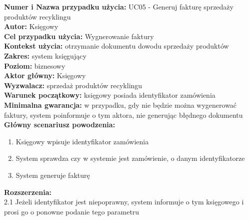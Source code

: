 \textbf{Numer i Nazwa przypadku użycia:} UC05 - Generuj fakturę sprzedaży produktów recyklingu \\
\textbf{Autor:} Księgowy\\
\textbf{Cel przypadku użycia:} Wygnerowanie faktury \\
\textbf{Kontekst użycia:} otrzymanie dokumentu dowodu sprzedaży produktów  \\
\textbf{Zakres:} system księgujący \\
\textbf{Poziom:} biznesowy \\
\textbf{Aktor główny:} Księgowy \\
\textbf{Wyzwalacz:} sprzedaż produktów recyklingu \\
\textbf{Warunek początkowy:} księgowy posiada identyfikator zamówienia \\
\textbf{Minimalna gwarancja:} w przypadku, gdy nie będzie można wygenerować faktury, system poinformuje o tym aktora, nie generując błędnego dokumentu \\
\textbf{Główny scenariusz powodzenia:} 
	\begin{enumerate}
		\item Księgowy wpisuje identyfikator zamówienia
		\item System sprawdza czy w systemie jest zamówienie, o danym identyfikatorze
		\item System generuje fakturę 
	\end{enumerate}
\textbf{Rozszerzenia:} \\
2.1 Jeżeli identyfikator jest niepoprawny, system informuje o tym księgowego i prosi go o ponowne podanie tego parametru

